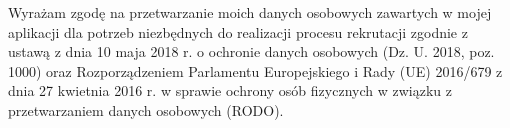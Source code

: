 \documentclass[a4paper, 10pt]{article}
\begin{document}
\vfill
\noindent\small Wyrażam zgodę na przetwarzanie moich danych osobowych zawartych w mojej aplikacji dla potrzeb niezbędnych do realizacji procesu rekrutacji zgodnie z ustawą z dnia 10 maja 2018 r. o ochronie danych osobowych (Dz. U. 2018, poz. 1000) oraz Rozporządzeniem Parlamentu Europejskiego i Rady (UE) 2016/679 z dnia 27 kwietnia 2016 r. w sprawie ochrony osób fizycznych w związku z przetwarzaniem danych osobowych (RODO).
\end{document}
